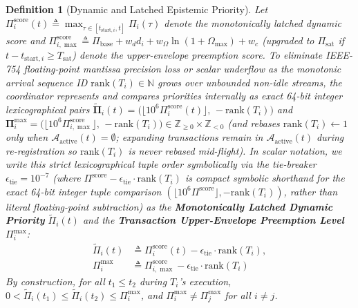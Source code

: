 \documentclass[conference,10pt]{IEEEtran}
\newtheorem{definition}{Definition}
\begin{document}
\begin{definition}[Dynamic and Latched Epistemic Priority]
Let $\Pi_i^{\text{score}}(t) \triangleq \max_{\tau \in [t_{\text{start},i}, t]} \Pi_i(\tau)$ denote the monotonically latched dynamic score and $\Pi_{i,\max}^{\text{score}} \triangleq \Pi_{\text{base}} + w_d d_i + w_\Omega \ln(1 + \Omega_{\max}) + w_c$ (upgraded to $\Pi_{\text{sat}}$ if $t - t_{\text{start},i} \ge T_{\text{sat}}$) denote the upper-envelope preemption score. To eliminate IEEE-754 floating-point mantissa precision loss or scalar underflow as the monotonic arrival sequence ID $\text{rank}(T_i) \in \mathbb{N}$ grows over unbounded non-idle streams, the coordinator represents and compares priorities internally as exact 64-bit integer lexicographical pairs $\tilde{\mathbf{\Pi}}_i(t) = \big(\lfloor 10^6 \Pi_i^{\text{score}}(t)\rfloor,\, -\text{rank}(T_i)\big)$ and $\mathbf{\Pi}_i^{\max} = \big(\lfloor 10^6 \Pi_{i,\max}^{\text{score}}\rfloor,\, -\text{rank}(T_i)\big) \in \mathbb{Z}_{\ge 0} \times \mathbb{Z}_{< 0}$ (and rebases $\text{rank}(T_i) \leftarrow 1$ only when $\mathcal{A}_{\text{active}}(t) = \emptyset$; expanding transactions remain in $\mathcal{A}_{\text{active}}(t)$ during re-registration so $\text{rank}(T_i)$ is never rebased mid-flight). In scalar notation, we write this strict lexicographical tuple order symbolically via the tie-breaker $\epsilon_{\text{tie}} = 10^{-7}$ (where $\Pi^{\text{score}} - \epsilon_{\text{tie}} \cdot \text{rank}(T_i)$ is compact symbolic shorthand for the exact 64-bit integer tuple comparison $(\lfloor 10^6 \Pi^{\text{score}} \rfloor, -\text{rank}(T_i))$, rather than literal floating-point subtraction) as the \textbf{Monotonically Latched Dynamic Priority} $\tilde{\Pi}_i(t)$ and the \textbf{Transaction Upper-Envelope Preemption Level} $\Pi_i^{\max}$:
\begin{align}
\tilde{\Pi}_i(t) &\triangleq \Pi_i^{\text{score}}(t) - \epsilon_{\text{tie}} \cdot \text{rank}(T_i), \\
\Pi_i^{\max} &\triangleq \Pi_{i,\max}^{\text{score}} - \epsilon_{\text{tie}} \cdot \text{rank}(T_i)
\end{align}
By construction, for all $t_1 \le t_2$ during $T_i$'s execution, $0 < \tilde{\Pi}_i(t_1) \le \tilde{\Pi}_i(t_2) \le \Pi_i^{\max}$, and $\Pi_i^{\max} \ne \Pi_j^{\max}$ for all $i \ne j$.
\end{definition}
\end{document}
